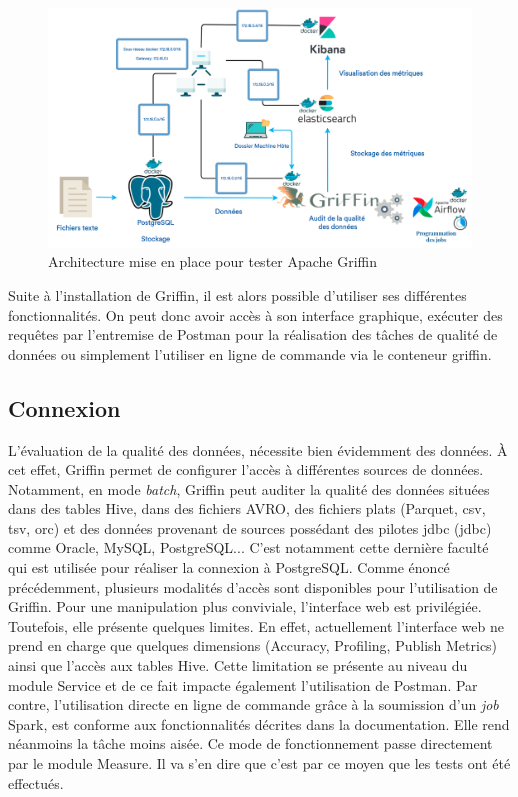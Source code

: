 \begin{figure}[H]
    \caption{Architecture mise en place pour tester Apache Griffin}  \label{fig:xray}
    \begin{center}
      \includegraphics[scale=0.43]{Main/Static/Archi_test_2.png} 
    \end{center}
\end{figure}
Suite \`a l'installation de Griffin, il est alors possible d'utiliser ses diff\'erentes fonctionnalit\'es. On peut  donc avoir acc\`es \`a son interface graphique, ex\'ecuter des requ\^etes par l'entremise de Postman pour la r\'ealisation des t\^aches de qualit\'e de donn\'ees ou simplement l'utiliser en ligne de commande via le conteneur griffin. 

\subsection{Connexion}
L'\'evaluation de la qualit\'e des donn\'ees, n\'ecessite bien \'evidemment des donn\'ees. \`A cet effet, Griffin permet de configurer l'acc\`es \`a diff\'erentes sources de donn\'ees. Notamment, en mode \textit{batch}, Griffin peut auditer la qualit\'e des donn\'ees situ\'ees dans des tables Hive, dans des fichiers AVRO, des fichiers plats (Parquet, \acrshort{csv}, \acrshort{tsv}, \acrshort{orc}) et des donn\'ees provenant de sources poss\'edant des pilotes \acrshort{jdbc} (\acrlong{jdbc}) comme Oracle, MySQL, PostgreSQL... C'est notamment cette derni\`ere facult\'e qui est utilis\'ee pour r\'ealiser la connexion \`a PostgreSQL. Comme \'enonc\'e pr\'ec\'edemment, plusieurs modalit\'es d'acc\`es sont disponibles pour l'utilisation de Griffin. Pour une manipulation plus conviviale, l'interface web est privil\'egi\'ee. Toutefois, elle pr\'esente quelques limites. En effet, actuellement l'interface web ne prend en charge que quelques dimensions (Accuracy, Profiling, Publish Metrics) ainsi que l'acc\`es aux tables Hive. Cette limitation se pr\'esente au niveau du module Service et de ce fait impacte \'egalement l'utilisation de Postman. Par contre, l'utilisation directe en ligne de commande gr\^ace \`a la soumission d'un \textit{job} Spark, est conforme aux fonctionnalit\'es d\'ecrites dans la documentation. Elle rend n\'eanmoins la t\^ache moins ais\'ee. Ce mode de fonctionnement passe directement par le module Measure. Il va s'en dire que c'est par ce moyen que les tests ont \'et\'e effectu\'es.
\\

